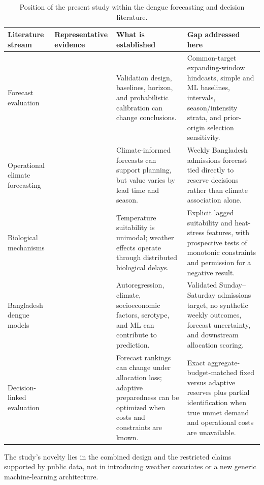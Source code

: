 \documentclass[11pt]{article}
\begin{document}
\begin{table}[H]
\centering
\caption{Position of the present study within the dengue forecasting and decision literature.}
\label{tab:literature}
\begin{threeparttable}
\footnotesize
\begin{tabularx}{\textwidth}{@{}p{}p{}XX@{}}
\toprule
Literature stream & Representative evidence & What is established & Gap addressed here \\
\midrule
Forecast evaluation & \citet{leung2023,johansson2016,johansson2019} & Validation design, baselines, horizon, and probabilistic calibration can change conclusions. & Common-target expanding-window hindcasts, simple and ML baselines, intervals, season/intensity strata, and prior-origin selection sensitivity. \\
Operational climate forecasting & \citet{lowe2014,colon2021} & Climate-informed forecasts can support planning, but value varies by lead time and season. & Weekly Bangladesh admissions forecast tied directly to reserve decisions rather than climate association alone. \\
Biological mechanisms & \citet{mordecai2017,ryan2019} & Temperature suitability is unimodal; weather effects operate through distributed biological delays. & Explicit lagged suitability and heat-stress features, with prospective tests of monotonic constraints and permission for a negative result. \\
Bangladesh dengue models & \citet{banu2015,dey2022,mobin2024,rahman2025,faruk2026,fuad2026} & Autoregression, climate, socioeconomic factors, serotype, and ML can contribute to prediction. & Validated Sunday--Saturday admissions target, no synthetic weekly outcomes, forecast uncertainty, and downstream allocation scoring. \\
Decision-linked evaluation & \citet{gerding2024,jiang2024,soto2026} & Forecast rankings can change under allocation loss; adaptive preparedness can be optimized when costs and constraints are known. & Exact aggregate-budget-matched fixed versus adaptive reserves plus partial identification when true unmet demand and operational costs are unavailable. \\
\bottomrule
\end{tabularx}
\begin{tablenotes}
\footnotesize
\item The study's novelty lies in the combined design and the restricted claims supported by public data, not in introducing weather covariates or a new generic machine-learning architecture.
\end{tablenotes}
\end{threeparttable}
\end{table}
\end{document}
